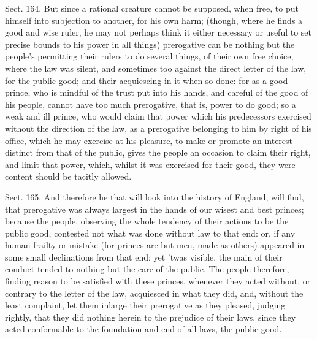 \documentclass[11pt,openany]{book}
\begin{document}
Sect. 164. But since a rational creature cannot be supposed, when free, to put himself into subjection to another, for his own harm; (though, where he finds a good and wise ruler, he may not perhaps think it either necessary or useful to set precise bounds to his power in all things) prerogative can be nothing but the people's permitting their rulers to do several things, of their own free choice, where the law was silent, and sometimes too against the direct letter of the law, for the public good; and their acquiescing in it when so done: for as a good prince, who is mindful of the trust put into his hands, and careful of the good of his people, cannot have too much prerogative, that is, power to do good; so a weak and ill prince, who would claim that power which his predecessors exercised without the direction of the law, as a prerogative belonging to him by right of his office, which he may exercise at his pleasure, to make or promote an interest distinct from that of the public, gives the people an occasion to claim their right, and limit that power, which, whilst it was exercised for their good, they were content should be tacitly allowed.

Sect. 165. And therefore he that will look into the history of England, will find, that prerogative was always largest in the hands of our wisest and best princes; because the people, observing the whole tendency of their actions to be the public good, contested not what was done without law to that end: or, if any human frailty or mistake (for princes are but men, made as others) appeared in some small declinations from that end; yet 'twas visible, the main of their conduct tended to nothing but the care of the public. The people therefore, finding reason to be satisfied with these princes, whenever they acted without, or contrary to the letter of the law, acquiesced in what they did, and, without the least complaint, let them inlarge their prerogative as they pleased, judging rightly, that they did nothing herein to the prejudice of their laws, since they acted conformable to the foundation and end of all laws, the public good.
\end{document}
